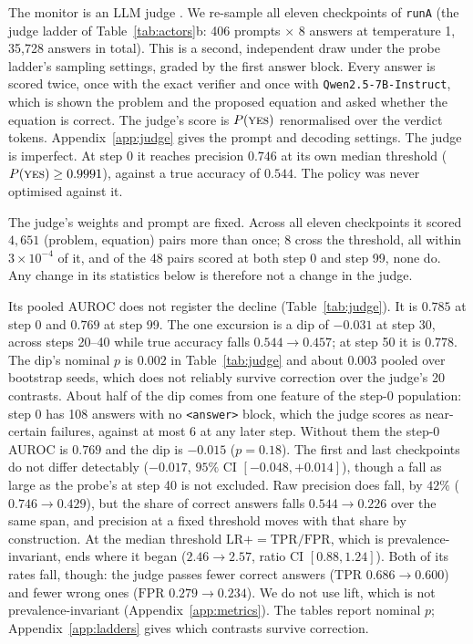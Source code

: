 \documentclass{article}
\begin{document}
The monitor is an LLM judge \citep{zheng2023judging}. We re-sample all eleven checkpoints of \texttt{runA} (the judge ladder of Table~\ref{tab:actors}b: 406 prompts $\times$ 8 answers at temperature 1, 35{,}728 answers in total). This is a second, independent draw under the probe ladder's sampling settings, graded by the first answer block. Every answer is scored twice, once with the exact verifier and once with \texttt{Qwen2.5-7B-Instruct}, which is shown the problem and the proposed equation and asked whether the equation is correct. The judge's score is $P(\textsc{yes})$ renormalised over the verdict tokens. Appendix~\ref{app:judge} gives the prompt and decoding settings. The judge is imperfect. At step 0 it reaches precision $0.746$ at its own median threshold ($P(\textsc{yes}) \geq 0.9991$), against a true accuracy of $0.544$. The policy was never optimised against it.

The judge's weights and prompt are fixed. Across all eleven checkpoints it scored $4{,}651$ (problem, equation) pairs more than once; 8 cross the threshold, all within $3\times10^{-4}$ of it, and of the 48 pairs scored at both step 0 and step 99, none do. Any change in its statistics below is therefore not a change in the judge.

Its pooled AUROC does not register the decline (Table~\ref{tab:judge}). It is $0.785$ at step 0 and $0.769$ at step 99. The one excursion is a dip of $-0.031$ at step 30, across steps 20--40 while true accuracy falls $0.544 \to 0.457$; at step 50 it is $0.778$. The dip's nominal $p$ is $0.002$ in Table~\ref{tab:judge} and about $0.003$ pooled over bootstrap seeds, which does not reliably survive correction over the judge's 20 contrasts. About half of the dip comes from one feature of the step-0 population: step 0 has 108 answers with no \texttt{<answer>} block, which the judge scores as near-certain failures, against at most 6 at any later step. Without them the step-0 AUROC is $0.769$ and the dip is $-0.015$ ($p=0.18$). The first and last checkpoints do not differ detectably ($-0.017$, $95\%$ CI $[-0.048, +0.014]$), though a fall as large as the probe's at step 40 is not excluded. Raw precision does fall, by $42\%$ ($0.746 \to 0.429$), but the share of correct answers falls $0.544 \to 0.226$ over the same span, and precision at a fixed threshold moves with that share by construction. At the median threshold $\mathrm{LR}+ = \mathrm{TPR}/\mathrm{FPR}$, which is prevalence-invariant, ends where it began ($2.46 \to 2.57$, ratio CI $[0.88, 1.24]$). Both of its rates fall, though: the judge passes fewer correct answers ($\mathrm{TPR}$ $0.686 \to 0.600$) and fewer wrong ones ($\mathrm{FPR}$ $0.279 \to 0.234$). We do not use lift, which is not prevalence-invariant (Appendix~\ref{app:metrics}). The tables report nominal $p$; Appendix~\ref{app:ladders} gives which contrasts survive correction.
\end{document}
